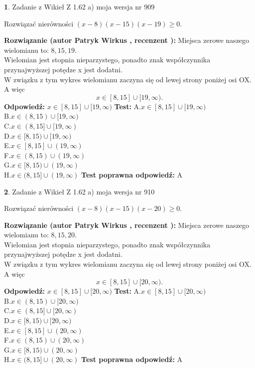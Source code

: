 \documentclass[12pt, a4paper]{article}
\theoremstyle{definition} %
\newtheorem{zad}{}
\newcommand{\zadStart}[1]{\begin{zad}#1\newline}
\newcommand{\zadStop}{\end{zad}}
\newcommand{\rozwStart}[2]{\noindent \textbf{Rozwiązanie (autor #1 , recenzent #2): }\newline}
\newcommand{\rozwStop}{\newline}
\newcommand{\odpStart}{\noindent \textbf{Odpowiedź:}\newline}
\newcommand{\odpStop}{\newline}
\newcommand{\testStart}{\noindent \textbf{Test:}\newline}
\newcommand{\testStop}{\newline}
\newcommand{\kluczStart}{\noindent \textbf{Test poprawna odpowiedź:}\newline}
\newcommand{\kluczStop}{\newline}
\begin{document}
\zadStart{Zadanie z Wikieł Z 1.62 a) moja wersja nr 909}

Rozwiązać nierówności $(x-8)(x-15)(x-19)\ge0$.
\zadStop
\rozwStart{Patryk Wirkus}{}
Miejsca zerowe naszego wielomianu to: $8, 15, 19$.\\
Wielomian jest stopnia nieparzystego, ponadto znak współczynnika przy\linebreak najwyższej potędze x jest dodatni.\\ W związku z tym wykres wielomianu zaczyna się od lewej strony poniżej osi OX. A więc $$x \in [8,15] \cup [19,\infty).$$
\rozwStop
\odpStart
$x \in [8,15] \cup [19,\infty)$
\odpStop
\testStart
A.$x \in [8,15] \cup [19,\infty)$\\
B.$x \in (8,15) \cup [19,\infty)$\\
C.$x \in (8,15] \cup [19,\infty)$\\
D.$x \in [8,15) \cup [19,\infty)$\\
E.$x \in [8,15] \cup (19,\infty)$\\
F.$x \in (8,15) \cup (19,\infty)$\\
G.$x \in [8,15) \cup (19,\infty)$\\
H.$x \in (8,15] \cup (19,\infty)$
\testStop
\kluczStart
A
\kluczStop



\zadStart{Zadanie z Wikieł Z 1.62 a) moja wersja nr 910}

Rozwiązać nierówności $(x-8)(x-15)(x-20)\ge0$.
\zadStop
\rozwStart{Patryk Wirkus}{}
Miejsca zerowe naszego wielomianu to: $8, 15, 20$.\\
Wielomian jest stopnia nieparzystego, ponadto znak współczynnika przy\linebreak najwyższej potędze x jest dodatni.\\ W związku z tym wykres wielomianu zaczyna się od lewej strony poniżej osi OX. A więc $$x \in [8,15] \cup [20,\infty).$$
\rozwStop
\odpStart
$x \in [8,15] \cup [20,\infty)$
\odpStop
\testStart
A.$x \in [8,15] \cup [20,\infty)$\\
B.$x \in (8,15) \cup [20,\infty)$\\
C.$x \in (8,15] \cup [20,\infty)$\\
D.$x \in [8,15) \cup [20,\infty)$\\
E.$x \in [8,15] \cup (20,\infty)$\\
F.$x \in (8,15) \cup (20,\infty)$\\
G.$x \in [8,15) \cup (20,\infty)$\\
H.$x \in (8,15] \cup (20,\infty)$
\testStop
\kluczStart
A
\kluczStop
\end{document}

